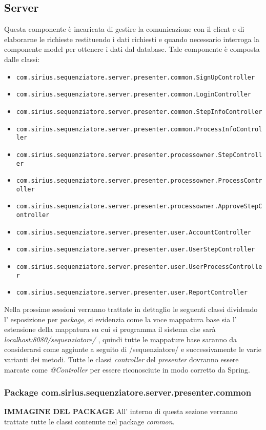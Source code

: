 \subsection{Server}
Questa componente è incaricata di gestire la comunicazione con il client e di elaborarne le richieste restituendo i dati richiesti e quando necessario interroga la componente model per ottenere i dati dal database.
Tale componente è composta dalle classi:
\begin{itemize}
	\item \texttt{com.sirius.sequenziatore.server.presenter.common.SignUpController}
	\item \texttt{com.sirius.sequenziatore.server.presenter.common.LoginController}
	\item \texttt{com.sirius.sequenziatore.server.presenter.common.StepInfoController}
	\item \texttt{com.sirius.sequenziatore.server.presenter.common.ProcessInfoController}
	\item \texttt{com.sirius.sequenziatore.server.presenter.processowner.StepController}
	\item \texttt{com.sirius.sequenziatore.server.presenter.processowner.ProcessController}
	\item \texttt{com.sirius.sequenziatore.server.presenter.processowner.ApproveStepController}
	\item \texttt{com.sirius.sequenziatore.server.presenter.user.AccountController}
	\item \texttt{com.sirius.sequenziatore.server.presenter.user.UserStepController}
	\item \texttt{com.sirius.sequenziatore.server.presenter.user.UserProcessController}
	\item \texttt{com.sirius.sequenziatore.server.presenter.user.ReportController}
\end{itemize}
Nella prossime sessioni verranno trattate in dettaglio le seguenti classi dividendo l' esposizione per \textit{package}, si evidenzia come la voce mappatura base sia l' estensione della mappatura su cui si programma il sistema che sarà \textit{localhost:8080/sequenziatore/} , quindi tutte le mappature base saranno da considerarsi come aggiunte a seguito di /sequenziatore/ e successivamente le varie varianti dei metodi.
Tutte le classi \textit{controller} del \textit{presenter} dovranno essere marcate come \textit{@Controller} per essere riconosciute in modo corretto da Spring.
\subsubsection{Package com.sirius.sequenziatore.server.presenter.common}
\textbf{IMMAGINE DEL PACKAGE}
All' interno di questa sezione verranno trattate tutte le classi contenute nel package \textit{common}.
